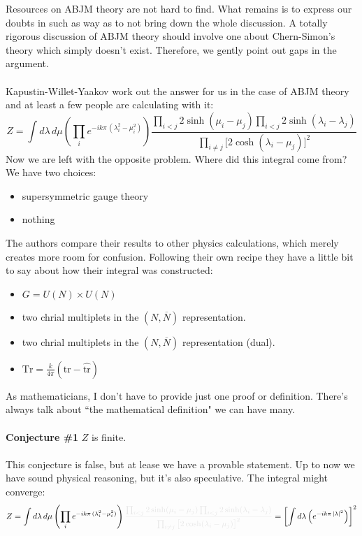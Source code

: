 \documentclass[12pt]{article}
\begin{document}
\newpage

\noindent Resources on ABJM theory are not hard to find.  What remains is to express our doubts in such as way as to not bring down the whole discussion.  A totally rigorous discussion of ABJM theory should involve one about Chern-Simon's theory which simply doesn't exist.  Therefore, we gently point out gaps in the argument. \\ \\
Kapustin-Willet-Yaakov work out the answer for us in the case of ABJM theory and at least a few people are calculating with it:
$$ Z = \int d\lambda \, d\mu  \left( \prod_i e^{-ik\pi \, (\lambda_i^2 - \mu_i^2) } \right) \frac{ \prod_{i < j} 2 \sinh (\mu_i - \mu_j) \prod_{i < j} 2 \sinh (\lambda_i - \lambda_j)}{\prod_{i \neq j}  \big[ 2\cosh(\lambda_i - \mu_j) \big]^2 } $$
Now we are left with the opposite problem.  Where did this integral come from?  We have two choices:
\begin{itemize}
\item supersymmetric gauge theory
\item nothing
\end{itemize}
The authors compare their results to other physics calculations, which merely creates more room for confusion.  Following their own recipe they have a little bit to say about how their integral was constructed:
\begin{itemize}
\item $G = U(N) \times U(N)$ 
\item two chrial multiplets in the $(N, \overline{N})$ representation.
\item two chrial multiplets in the $(N, \overline{N})$ representation (dual).
\item $\mathrm{Tr} = \frac{k}{4\pi} (\mathrm{tr} - \hat{\mathrm{tr}}) $
\end{itemize}
As mathematicians, I don't have to provide just one proof or definition.  There's always talk about ``the mathematical definition" we can have many. \\ \\
\textbf{Conjecture \#1}  $Z$ is finite. \\ \\
This conjecture is false, but at lease we have a provable statement. Up to now we have sound physical reasoning, but it's also speculative.  The integral might converge:
$$ Z = \int d\lambda \, d\mu  \left( \prod_i e^{-ik\pi \, (\lambda_i^2 - \mu_i^2) } \right) 
{ \color{black!10!white} \frac{ \prod_{i < j} 2 \sinh (\mu_i - \mu_j) \prod_{i < j} 2 \sinh (\lambda_i - \lambda_j)}{\prod_{i \neq j}  \big[ 2\cosh(\lambda_i - \mu_j) \big]^2 } } =
\left[ \int d\lambda  \left( e^{-ik\pi \, |\lambda|^2  } \right) \right]^2  $$
\end{document}
